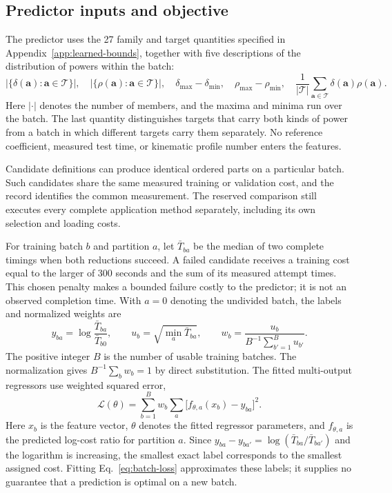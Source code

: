 \subsection{Predictor inputs and objective}
The predictor uses the 27 family and target quantities specified in
Appendix~\ref{app:learned-bounds}, together with five descriptions of the
distribution of powers within the batch:
\begin{equation}
 |\{\delta(\boldsymbol a):\boldsymbol a\in\mathcal T\}|,\quad
 |\{\rho(\boldsymbol a):\boldsymbol a\in\mathcal T\}|,\quad
 \delta_{\max}-\delta_{\min},\quad
 \rho_{\max}-\rho_{\min},\quad
 \frac{1}{|\mathcal T|}\sum_{\boldsymbol a\in\mathcal T}
             \delta(\boldsymbol a)\rho(\boldsymbol a).
\end{equation}
Here $|\cdot|$ denotes the number of members, and the maxima and minima run
over the batch. The last quantity distinguishes targets that carry both
kinds of power from a batch in which different targets carry them separately.
No reference coefficient, measured test time, or kinematic profile number
enters the features.

Candidate definitions can produce identical ordered parts on a particular
batch. Such candidates share the same measured training or validation cost,
and the record identifies the common measurement. The reserved comparison
still executes every complete application method separately, including its
own selection and loading costs.

For training batch $b$ and partition $a$, let $\bar T_{ba}$ be the median of
two complete timings when both reductions succeed. A failed candidate
receives a training cost equal to the larger of 300 seconds and the sum of
its measured attempt times. This chosen penalty makes a bounded failure
costly to the predictor; it is not an observed completion time. With
$a=0$ denoting the undivided batch, the labels and normalized weights are
\begin{equation}
 y_{ba}=\log\frac{\bar T_{ba}}{\bar T_{b0}},\qquad
 u_b=\sqrt{\min_a\bar T_{ba}},\qquad
 w_b=\frac{u_b}{B^{-1}\sum_{b'=1}^{B}u_{b'}}.
\end{equation}
The positive integer $B$ is the number of usable training batches. The
normalization gives $B^{-1}\sum_b w_b=1$ by direct substitution. The fitted
multi-output regressors use weighted squared error,
\begin{equation}
 \mathcal L(\theta)=\sum_{b=1}^{B}w_b\sum_a
       \bigl[f_{\theta,a}(x_b)-y_{ba}\bigr]^2.
 \label{eq:batch-loss}
\end{equation}
Here $x_b$ is the feature vector, $\theta$ denotes the fitted regressor
parameters, and $f_{\theta,a}$ is the predicted log-cost ratio for partition $a$. Since
$y_{ba}-y_{ba'}=\log(\bar T_{ba}/\bar T_{ba'})$ and the logarithm is increasing,
the smallest exact label corresponds to the smallest assigned cost. Fitting
Eq.~\eqref{eq:batch-loss} approximates these labels; it supplies no guarantee
that a prediction is optimal on a new batch.

